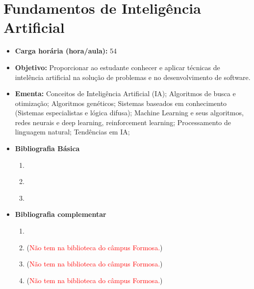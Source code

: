 \documentclass[
	10pt,				%
	openright,			%
	twoside,			%
	a4paper,			%
	english,			%
	french,				%
	brazil,				%
	sumario=tradicional
]{abntex2}
\begin{document}
\section*{Fundamentos de Inteligência Artificial}\label{6_ia}
\begin{itemize}
	\item \textbf{Carga horária (hora/aula):} 54
	\item \textbf{Objetivo:} Proporcionar ao estudante conhecer e aplicar técnicas de intelência artificial na solução de problemas e no desenvolvimento de software.
	\item \textbf{Ementa:} 
	Conceitos de Inteligência Artificial (IA);
	Algoritmos de busca e otimização;
	Algoritmos genéticos;
	Sistemas baseados em conhecimento (Sistemas especialistas e lógica difusa);
	Machine Learning e seus algoritmos, redes neurais e deep learning, reinforcement learning;
	Processamento de linguagem natural; 
	Tendências em IA;
	\item \textbf{Bibliografia Básica}
	\begin{enumerate}
		\item \cite{russellnorvig2013ia}
		\item \cite{almir2009ia}
		\item \cite{barbetta2004estatistica}
	\end{enumerate}
	\item \textbf{Bibliografia complementar}
	\begin{enumerate}
		\item \cite{farberestatistica}
		\item \cite{luger2013ia} (\textcolor{red}{Não tem na biblioteca do câmpus Formosa.})
		\item \cite{carvalho2011ia} (\textcolor{red}{Não tem na biblioteca do câmpus Formosa.})
		\item \cite{haykin2001ia} (\textcolor{red}{Não tem na biblioteca do câmpus Formosa.})
	\end{enumerate} 	
\end{itemize}





\newpage
\end{document}
